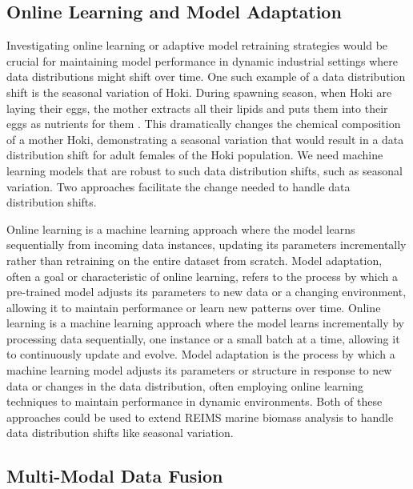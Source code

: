 \subsection{Online Learning and Model Adaptation}

Investigating online learning or adaptive model retraining strategies would be crucial for maintaining model performance in dynamic industrial settings where data distributions might shift over time. One such example of a data distribution shift is the seasonal variation of Hoki. During spawning season, when Hoki are laying their eggs, the mother extracts all their lipids and puts them into their eggs as nutrients for them \citep{OpenSeas2021}. This dramatically changes the chemical composition of a mother Hoki, demonstrating a seasonal variation that would result in a data distribution shift for adult females of the Hoki population. We need machine learning models that are robust to such data distribution shifts, such as seasonal variation. Two approaches facilitate the change needed to handle data distribution shifts.

Online learning \citep{Hoi2021} is a machine learning approach where the model learns sequentially from incoming data instances, updating its parameters incrementally rather than retraining on the entire dataset from scratch. Model adaptation, often a goal or characteristic of online learning, refers to the process by which a pre-trained model adjusts its parameters to new data or a changing environment, allowing it to maintain performance or learn new patterns over time.
Online learning is a machine learning approach where the model learns incrementally by processing data sequentially, one instance or a small batch at a time, allowing it to continuously update and evolve. Model adaptation \citep{Chougiouris2024,Kabra2024} is the process by which a machine learning model adjusts its parameters or structure in response to new data or changes in the data distribution, often employing online learning techniques to maintain performance in dynamic environments.
Both of these approaches could be used to extend REIMS marine biomass analysis to handle data distribution shifts like seasonal variation.

\subsection{Multi-Modal Data Fusion}

